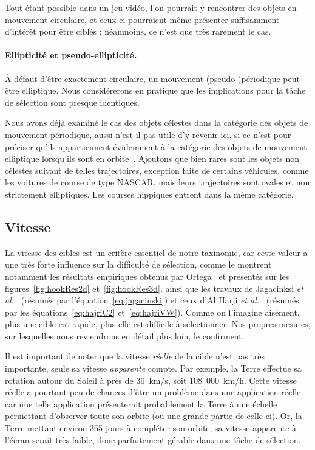 	Tout étant possible dans un jeu vidéo, l'on pourrait y rencontrer des objets en mouvement circulaire, et ceux-ci pourraient même présenter suffisamment d'intérêt pour être ciblés ; néanmoins, ce n'est que très rarement le cas.
	
	\paragraph{Ellipticité et pseudo-ellipticité.}
	À défaut d'être exactement circulaire, un mouvement (pseudo-)périodique peut être elliptique. Nous considérerons en pratique que les implications pour la tâche de sélection sont presque identiques.
	
	Nous avons déjà examiné le cas des objets célestes dans la catégorie des objets de mouvement périodique, aussi n'est-il pas utile d'y revenir ici, si ce n'est pour préciser qu'ils appartiennent évidemment à la catégorie des objets de mouvement elliptique lorsqu'ils sont en orbite~\cite{kepler1953epitome}. Ajoutons que bien rares sont les objets non célestes suivant de telles trajectoires, exception faite de certains véhicules, comme les voitures de course de type NASCAR, mais leurs trajectoires sont ovales et non strictement elliptiques. Les courses hippiques entrent dans la même catégorie.
	
	\subsection{Vitesse}
	La vitesse des cibles est un critère essentiel de notre taxinomie, car cette valeur a une très forte influence sur la difficulté de sélection, comme le montrent notamment les résultats empiriques obtenus par Ortega~\cite{ortega2013hook} et présentés sur les figures~\ref{fig:hookRes2d} et~\ref{fig:hookRes3d}, ainsi que les travaux de Jagacinksi \emph{et al.}~\cite{jagacinski1980test} (résumés par l'équation~\ref{eq:jagacinski}) et ceux d'Al Harji \emph{et al.}~\cite{hajri2011moving} (résumés par les équations~\ref{eq:hajriC2} et~\ref{eq:hajriVW}). Comme on l'imagine aisément, plus une cible est rapide, plus elle est difficile à sélectionner. Nos propres mesures, sur lesquelles nous reviendrons en détail plus loin, le confirment.
	
	Il est important de noter que la vitesse \emph{réelle} de la cible n'est pas très importante, seule sa vitesse \emph{apparente} compte. Par exemple, la Terre effectue sa rotation autour du Soleil à près de 30~km/s, soit 108~000~km/h. Cette vitesse réelle a pourtant peu de chances d'être un problème dans une application réelle car une telle application présenterait probablement la Terre à une échelle permettant d'observer toute son orbite (ou une grande partie de celle-ci). Or, la Terre mettant environ 365 jours à compléter son orbite, sa vitesse apparente à l'écran serait très faible, donc parfaitement gérable dans une tâche de sélection.
	
